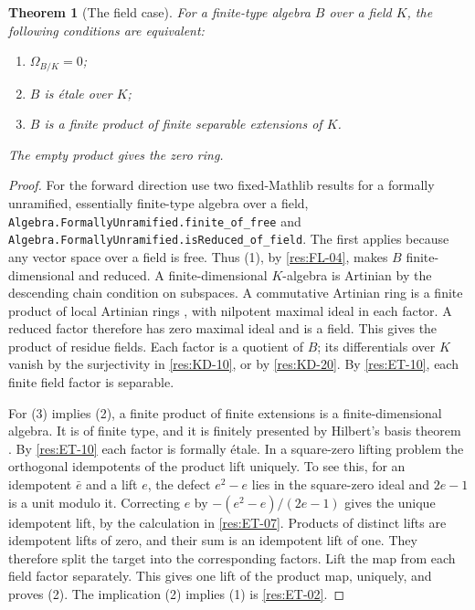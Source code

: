\documentclass[11pt,oneside,openany]{book}
\newtheorem{theorem}{Theorem}[chapter]
\theoremstyle{definition}
\theoremstyle{remark}
\begin{document}
\begin{theorem}[The field case]\label{res:ET-11}
For a finite-type algebra $B$ over a field $K$, the following
conditions are equivalent:
\begin{enumerate}
\item $\Omega_{B/K}=0$;
\item $B$ is \'{e}tale over $K$;
\item $B$ is a finite product of finite separable extensions of $K$.
\end{enumerate}
The empty product gives the zero ring.
\end{theorem}
\begin{proof}
For the forward direction use two fixed-Mathlib results for a
formally unramified, essentially finite-type algebra over a field,
\texttt{Algebra.FormallyUnramified.finite\_of\_free} and
\texttt{Algebra.FormallyUnramified.isReduced\_of\_field}.
The first applies because any vector space over a field is free.
Thus (1), by \ref{res:FL-04}, makes $B$ finite-dimensional
and reduced. A finite-dimensional $K$-algebra is Artinian by
the descending chain condition on subspaces. A commutative
Artinian ring is a finite product of local Artinian rings
\cite[Chapter 3, ALG-03-C03-S02]{p103}, with nilpotent maximal
ideal in each factor. A reduced factor therefore has zero maximal
ideal and is a field. This gives the product of residue fields.
Each factor is a quotient of $B$; its differentials over $K$ vanish
by the surjectivity in \ref{res:KD-10}, or by \ref{res:KD-20}.
By \ref{res:ET-10}, each finite field factor is separable.

For (3) implies (2), a finite product of finite extensions is a
finite-dimensional algebra. It is of finite type, and it is
finitely presented by Hilbert's basis theorem
\cite[Chapter 5]{p103}. By \ref{res:ET-10} each factor is formally
\'etale. In a square-zero lifting problem the orthogonal idempotents
of the product lift uniquely. To see this, for an idempotent
$\bar e$ and a lift $e$, the defect $e^2-e$ lies in the square-zero
ideal and $2e-1$ is a unit modulo it. Correcting $e$ by
$-(e^2-e)/(2e-1)$ gives the unique idempotent lift, by the
calculation in \ref{res:ET-07}. Products of distinct lifts are
idempotent lifts of zero, and their sum is an idempotent lift of
one. They therefore split the target into the corresponding
factors. Lift the map from each field factor separately. This
gives one lift of the product map, uniquely, and proves (2).
The implication (2) implies (1) is \ref{res:ET-02}.
\end{proof}
\end{document}
